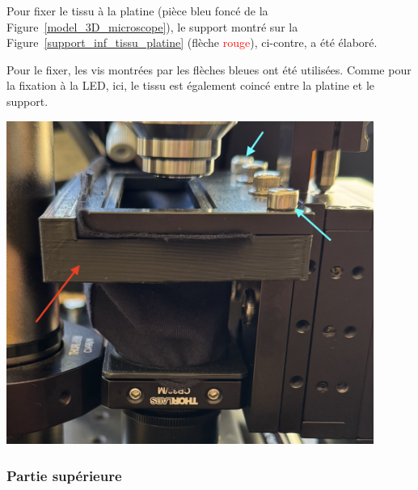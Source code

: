 \begin{minipage}[c]{0.48\textwidth}
    Pour fixer le tissu à la platine (pièce \textcolor[RGB]{30, 50, 150}{bleu foncé} de la Figure~\ref{model_3D_microscope}), le support montré sur la Figure~\ref{support_inf_tissu_platine} (flèche \textcolor{red}{rouge}), ci-contre, a été élaboré.

    \vspace{1em}
    Pour le fixer, les vis montrées par les flèches \textcolor[RGB]{115, 210, 210}{bleues} ont été utilisées. Comme pour la fixation à la LED, ici, le tissu est également coincé entre la platine et le support.
\end{minipage}\hfill
\begin{minipage}[c]{0.48\textwidth}
    \begin{center}
        \includegraphics[width=0.9\textwidth]{assets/figures/Protections_laser/Securite_mecanique/Protection_vers_microscope/support_inf_tissu_platine.jpeg}
    \end{center}
    \label{support_inf_tissu_platine}
\end{minipage}

\subsubsection{Partie supérieure}

